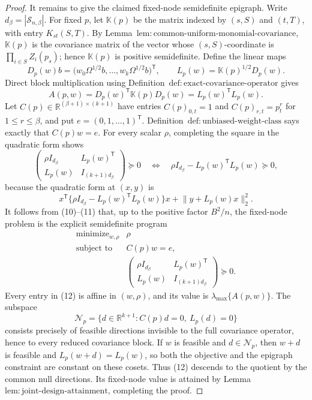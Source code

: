 \documentclass{article}
\begin{document}
\begin{proof}
It remains to give the claimed fixed-node semidefinite epigraph.  Write \(d_\beta=|\mathcal S_{n,\beta}|\).  For fixed \(p\), let \(\mathbb K(p)\) be the matrix indexed by \((s,S)\) and \((t,T)\), with entry \(K_{st}(S,T)\).  By Lemma~\(\mathrm{lem{:}common\text{-}uniform\text{-}monomial\text{-}covariance}\), \(\mathbb K(p)\) is the covariance matrix of the vector whose \((s,S)\)-coordinate is \(\prod_{i\in S}Z_i(p_s)\); hence \(\mathbb K(p)\) is positive semidefinite.  Define the linear maps
\[
D_p(w)b=
\bigl(w_0\Omega^{1/2}b,\ldots,w_k\Omega^{1/2}b\bigr)^{\mathsf T},
\qquad
L_p(w)=\mathbb K(p)^{1/2}D_p(w).
\]
Direct block multiplication using Definition~\(\mathrm{def{:}exact\text{-}covariance\text{-}operator}\) gives
\[
A(p,w)=D_p(w)^{\mathsf T}\mathbb K(p)D_p(w)
=L_p(w)^{\mathsf T}L_p(w).
\tag{10}
\]
Let \(C(p)\in\mathbb R^{(\beta+1)\times(k+1)}\) have entries \(C(p)_{0,t}=1\) and \(C(p)_{r,t}=p_t^r\) for \(1\le r\le\beta\), and put \(e=(0,1,\ldots,1)^{\mathsf T}\).  Definition~\(\mathrm{def{:}unbiased\text{-}weight\text{-}class}\) says exactly that \(C(p)w=e\).  For every scalar \(\rho\), completing the square in the quadratic form shows
\[
\begin{pmatrix}
\rho I_{d_\beta}&L_p(w)^{\mathsf T}\\
L_p(w)&I_{(k+1)d_\beta}
\end{pmatrix}\succeq0
\quad\Longleftrightarrow\quad
\rho I_{d_\beta}-L_p(w)^{\mathsf T}L_p(w)\succeq0,
\tag{11}
\]
because the quadratic form at \((x,y)\) is
\[
x^{\mathsf T}\{\rho I_{d_\beta}-L_p(w)^{\mathsf T}L_p(w)\}x
+\lVert y+L_p(w)x\rVert_2^2.
\]
It follows from (10)--(11) that, up to the positive factor \(B^2/n\), the fixed-node problem is the explicit semidefinite program
\[
\begin{array}{ll}
\operatorname{minimize}_{w,\rho}&\rho\\
\operatorname{subject\ to}&C(p)w=e,\\
&\begin{pmatrix}
\rho I_{d_\beta}&L_p(w)^{\mathsf T}\\
L_p(w)&I_{(k+1)d_\beta}
\end{pmatrix}\succeq0.
\end{array}
\tag{12}
\]
Every entry in (12) is affine in \((w,\rho)\), and its value is \(\lambda_{\max}\{A(p,w)\}\).  The subspace
\[
\mathcal N_p=\{d\in\mathbb R^{k+1}:C(p)d=0,\ L_p(d)=0\}
\]
consists precisely of feasible directions invisible to the full covariance operator, hence to every reduced covariance block.  If \(w\) is feasible and \(d\in\mathcal N_p\), then \(w+d\) is feasible and \(L_p(w+d)=L_p(w)\), so both the objective and the epigraph constraint are constant on these cosets.  Thus (12) descends to the quotient by the common null directions.  Its fixed-node value is attained by Lemma~\(\mathrm{lem{:}joint\text{-}design\text{-}attainment}\), completing the proof.
\end{proof}
\end{document}
